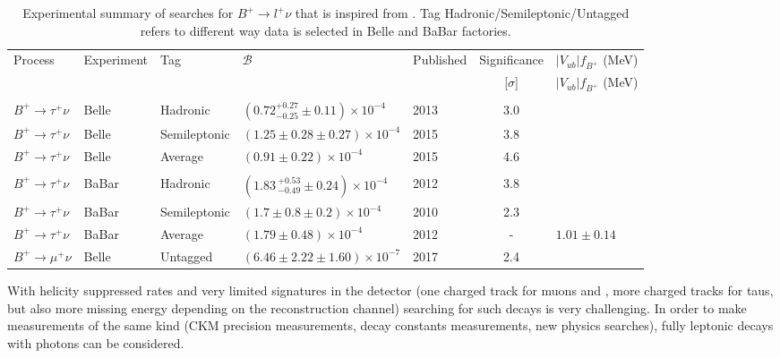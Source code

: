 \begin{table}[ht]
\begin{center}
\begin{tabular}{ l l l l H c H} \toprule
        Process &Experiment & Tag &${\mathcal{B}}$ & Published & Significance & {$|V_{ub}|f_{B^+}$ (MeV)} \hfill\\
	 & &  & & & [$\sigma$] & {$|V_{ub}|f_{B^+}$ (MeV)} \hfill\\
\hline\\[-2.5ex]
        $B^{+}\rightarrow \tau^{+}\nu$  &Belle~\cite{Adachi:2012mm}&Hadronic&$(0.72^{+0.27}_{-0.25}\pm0.11)\times10^{-4}$  & 2013 & 3.0 \\
        $B^{+}\rightarrow \tau^{+}\nu$  &Belle~\cite{Kronenbitter:2015kls}&Semileptonic&$(1.25\pm0.28\pm0.27)\times10^{-4}$ & 2015 & 3.8 \\
        $B^{+}\rightarrow \tau^{+}\nu$  &Belle~\cite{Kronenbitter:2015kls}&Average&$(0.91 \pm 0.22)\times10^{-4}$ & 2015 & 4.6 \\\hline\\[-2.5ex]
        $B^{+}\rightarrow \tau^{+}\nu$  &BaBar~\cite{Lees:2012ju} & Hadronic & $(1.83\,^{+0.53}_{-0.49}\pm0.24)\times10^{-4}$ & 2012 & 3.8 \\
        $B^{+}\rightarrow \tau^{+}\nu$  &BaBar~\cite{Aubert:2009wt} & Semileptonic & $(1.7\pm 0.8\pm 0.2)\times10^{-4}$ & 2010 & 2.3\\
        $B^{+}\rightarrow \tau^{+}\nu$  &BaBar~\cite{Lees:2012ju} & Average & $(1.79 \pm 0.48)\times 10^{-4}$ & 2012 & - & $1.01\pm 0.14$  \\ \hline
$B^{+}\rightarrow \mu^{+}\nu$ & Belle~\cite{Sibidanov:2017vph} & Untagged& $(6.46\pm2.22\pm 1.60)\times 10^{-7}$ & 2017 & 2.4 &\\
\bottomrule
\end{tabular}
\end{center}
\caption{Experimental summary of searches for $B^{+}\rightarrow l^{+}\nu$ that is inspired from \cite{Patrignani:2016xqp}. Tag Hadronic/Semileptonic/Untagged refers to different way data is selected in Belle and BaBar factories.}
\label{tab:sum}
\end{table}




With helicity suppressed rates and very limited signatures in the detector (one charged track for muons and \DIFdelbegin {}\DIFdelend \DIFaddbegin {}\DIFaddend , more charged tracks for taus, but also more missing energy depending on the reconstruction channel) searching for such decays is very challenging. In order to make measurements of the same kind (CKM precision measurements, decay constants measurements, new physics searches), fully leptonic decays with photons can be considered. \DIFaddbegin {}\DIFaddend 

